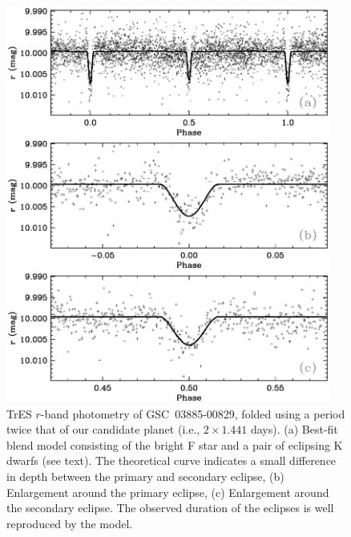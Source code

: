 \begin{figure}
\begin{center}
\includegraphics[width=0.95\textwidth]{3_f6}
\caption[$r$-band photometry modeled as an F/K+K blend]{TrES $r$-band photometry of \mbox{GSC 03885-00829}, folded
  using a period twice that of our candidate planet (i.e., $2 \times
  1.441$ days). (a) Best-fit blend model consisting of the bright F
  star and a pair of eclipsing K dwarfs (see text). The theoretical
  curve indicates a small difference in depth between the primary and
  secondary eclipse, (b) Enlargement around the primary eclipse, (c)
  Enlargement around the secondary eclipse. The observed duration of
  the eclipses is well reproduced by the model.}\label{cha:gsc:fig:MMmodel}
\end{center}
\end{figure}

